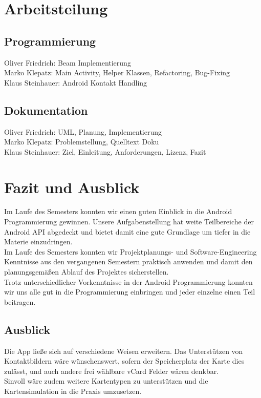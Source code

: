 \documentclass[a4paper,ngerman,12pt]{scrreprt}
\begin{document}
\chapter{Arbeitsteilung}
\section*{Programmierung}

Oliver Friedrich: Beam Implementierung \\ 
Marko Klepatz: Main Activity, Helper Klassen, Refactoring, Bug-Fixing\\
Klaus Steinhauer: Android Kontakt Handling\\ 

\section*{Dokumentation}

Oliver Friedrich: UML, Planung, Implementierung\\
Marko Klepatz: Problemstellung, Quelltext Doku\\
Klaus Steinhauer: Ziel, Einleitung, Anforderungen, Lizenz, Fazit\\

\chapter{Fazit und Ausblick}

Im Laufe des Semesters konnten wir einen guten Einblick in die Android Programmierung gewinnen. Unsere Aufgabenstellung hat weite Teilbereiche der Android API abgedeckt und bietet damit eine gute Grundlage um tiefer in die Materie einzudringen. \\
Im Laufe des Semesters konnten wir Projektplanungs- und Software-Engineering Kenntnisse aus den vergangenen Semestern praktisch anwenden und damit den planungsgemäßen Ablauf des Projektes sicherstellen.\\ 
Trotz unterschiedlicher Vorkenntnisse in der Android Programmierung konnten wir uns alle gut in die Programmierung einbringen und jeder einzelne einen Teil beitragen.

\section{Ausblick}

Die App ließe sich auf verschiedene Weisen erweitern. Das Unterstützen von Kontaktbildern wäre wünschenswert, sofern der Speicherplatz der Karte dies zulässt, und auch andere frei wählbare vCard Felder wären denkbar. \\ Sinvoll wäre zudem weitere Kartentypen zu unterstützen und die Kartensimulation in die Praxis umzusetzen. 
\end{document}
